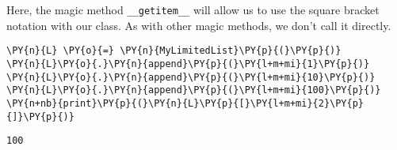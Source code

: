 Here, the magic method \texttt{\_\_getitem\_\_} will allow us to use the square bracket notation with our class.  As with other magic methods, we don’t call it directly.


\begin{Verbatim}[commandchars=\\\{\}]
\PY{n}{L} \PY{o}{=} \PY{n}{MyLimitedList}\PY{p}{(}\PY{p}{)}
\PY{n}{L}\PY{o}{.}\PY{n}{append}\PY{p}{(}\PY{l+m+mi}{1}\PY{p}{)}
\PY{n}{L}\PY{o}{.}\PY{n}{append}\PY{p}{(}\PY{l+m+mi}{10}\PY{p}{)}
\PY{n}{L}\PY{o}{.}\PY{n}{append}\PY{p}{(}\PY{l+m+mi}{100}\PY{p}{)}
\PY{n+nb}{print}\PY{p}{(}\PY{n}{L}\PY{p}{[}\PY{l+m+mi}{2}\PY{p}{]}\PY{p}{)}
\end{Verbatim}

\begin{Verbatim}
100

\end{Verbatim}
